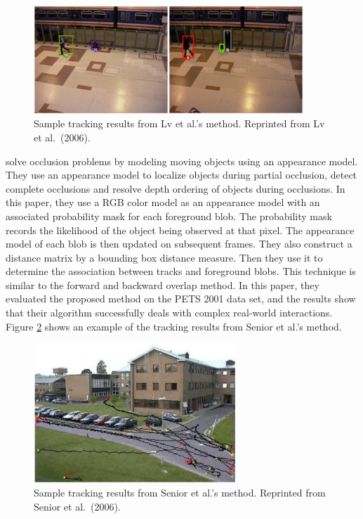 \begin{figure}[t]
  \centering
  \includegraphics[width=4in]{figures/lv-blob-tracking-results.png}
  \caption[Sample tracking results from Lv et al.'s method.]{\small
    Sample tracking results from Lv et al.'s method. Reprinted from Lv
    et al.\ (2006).}
  \label{fig:lv-blob-tracking-results}
\end{figure}

 solve occlusion problems by
modeling moving objects using an appearance model. They use an
appearance model to localize objects during partial occlusion, detect
complete occlusions and resolve depth ordering of objects during
occlusions. In this paper, they use a RGB color model as an appearance
model with an associated probability mask for each foreground
blob. The probability mask records the likelihood of the object being
observed at that pixel.  The appearance model of each blob is then
updated on subsequent frames. They also construct a distance matrix by
a bounding box distance measure. Then they use it to determine the
association between tracks and foreground blobs. This technique is
similar to the forward and backward overlap method. In this paper,
they evaluated the proposed method on the PETS 2001 data set, and the
results show that their algorithm successfully deals with complex
real-world interactions. Figure \ref{fig:senior-tracking-results}
shows an example of the tracking results from Senior et al.'s method.

\begin{figure}[t]
  \centering
  \includegraphics[width=3in]{figures/senior-tracking-results-for-dataset-1.png}
  \caption[Sample tracking results from Senior et al.'s
    method.]{\small Sample tracking results from Senior et al.'s
    method. Reprinted from Senior et al.\ (2006).}
  \label{fig:senior-tracking-results}
\end{figure}

